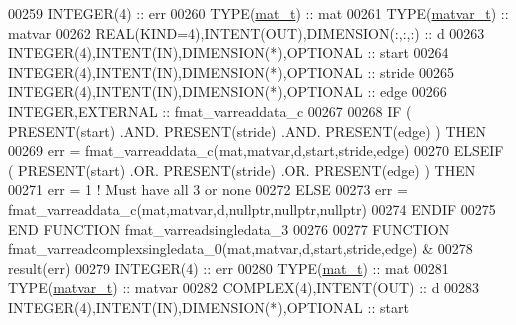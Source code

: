 \begin{DoxyCode}
00259     \textcolor{keywordtype}{INTEGER(4)}                                  :: err
00260     \textcolor{keywordtype}{TYPE}(\hyperlink{group___m_a_t_gab0fc888f5a5d79943b16284b1f91c2e8}{mat\_t})                                 :: mat
00261     \textcolor{keywordtype}{TYPE}(\hyperlink{group___m_a_t_structmatvar__t}{matvar\_t})                              :: matvar
00262     \textcolor{keywordtype}{REAL(KIND=4)},\textcolor{keywordtype}{INTENT(OUT)},\textcolor{keywordtype}{DIMENSION(:,:,:)}   :: d
00263     \textcolor{keywordtype}{INTEGER(4)},\textcolor{keywordtype}{INTENT(IN)},\textcolor{keywordtype}{DIMENSION(*)},\textcolor{keywordtype}{OPTIONAL} :: start
00264     \textcolor{keywordtype}{INTEGER(4)},\textcolor{keywordtype}{INTENT(IN)},\textcolor{keywordtype}{DIMENSION(*)},\textcolor{keywordtype}{OPTIONAL} :: stride
00265     \textcolor{keywordtype}{INTEGER(4)},\textcolor{keywordtype}{INTENT(IN)},\textcolor{keywordtype}{DIMENSION(*)},\textcolor{keywordtype}{OPTIONAL} :: edge
00266     \textcolor{keywordtype}{INTEGER},\textcolor{keywordtype}{EXTERNAL}                            :: fmat\_varreaddata\_c
00267 
00268     \textcolor{keywordflow}{IF} ( \textcolor{keyword}{PRESENT}(start) .AND. \textcolor{keyword}{PRESENT}(stride) .AND. \textcolor{keyword}{PRESENT}(edge) ) \textcolor{keywordflow}{THEN}
00269         err = fmat\_varreaddata\_c(mat,matvar,d,start,stride,edge)
00270     \textcolor{keywordflow}{ELSEIF} ( \textcolor{keyword}{PRESENT}(start) .OR. \textcolor{keyword}{PRESENT}(stride) .OR. \textcolor{keyword}{PRESENT}(edge) ) \textcolor{keywordflow}{THEN}
00271         err = 1    \textcolor{comment}{! Must have all 3 or none}
00272     \textcolor{keywordflow}{ELSE}
00273         err = fmat\_varreaddata\_c(mat,matvar,d,nullptr,nullptr,nullptr)
00274 \textcolor{keywordflow}{    ENDIF}
00275 \textcolor{keyword}{END FUNCTION }fmat\_varreadsingledata\_3
00276 
00277 \textcolor{keyword}{FUNCTION }fmat\_varreadcomplexsingledata\_0(mat,matvar,d,start,stride,edge) &
00278                                                              result(err)
00279     \textcolor{keywordtype}{INTEGER(4)}                                  :: err
00280     \textcolor{keywordtype}{TYPE}(\hyperlink{group___m_a_t_gab0fc888f5a5d79943b16284b1f91c2e8}{mat\_t})                                 :: mat
00281     \textcolor{keywordtype}{TYPE}(\hyperlink{group___m_a_t_structmatvar__t}{matvar\_t})                              :: matvar
00282     \textcolor{keywordtype}{COMPLEX(4)},\textcolor{keywordtype}{INTENT(OUT)}                  :: d
00283     \textcolor{keywordtype}{INTEGER(4)},\textcolor{keywordtype}{INTENT(IN)},\textcolor{keywordtype}{DIMENSION(*)},\textcolor{keywordtype}{OPTIONAL} :: start

\end{DoxyCode}
